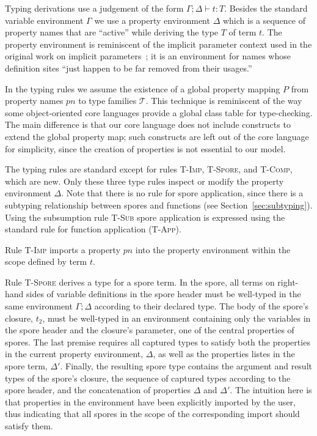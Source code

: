 \documentclass[a4paper,twoside]{article}
\begin{document}
Typing derivations use a judgement of the form $\Gamma ; \Delta \vdash t : T$. Besides the standard variable environment $\Gamma$ we use a property environment $\Delta$ which is a sequence of property names that are ``active'' while deriving the type $T$ of term $t$. The property environment is reminiscent of the implicit parameter context used in the original work on implicit parameters~\cite{LewisLMS00}; it is an environment for names whose definition sites ``just happen to be far removed from their usages.''

In the typing rules we assume the existence of a global property mapping $P$ from property names $pn$ to type families $\mathcal{T}$. This technique is reminiscent of the way some object-oriented core languages provide a global class table for type-checking. The main difference is that our core language does not include constructs to extend the global property map; such constructs are left out of the core language for simplicity, since the creation of properties is not essential to our model.

The typing rules are standard except for rules \textsc{T-Imp}, \textsc{T-Spore}, and \textsc{T-Comp}, which are new. Only these three type rules inspect or modify the property environment $\Delta$. Note that there is no rule for spore application, since there is a subtyping relationship between spores and functions (see Section~\ref{sec:subtyping}). Using the subsumption rule \textsc{T-Sub} spore application is expressed using the standard rule for function application (\textsc{T-App}).

Rule \textsc{T-Imp} imports a property $pn$ into the property environment within the scope defined by term $t$.

Rule \textsc{T-Spore} derives a type for a spore term. In the spore, all terms on right-hand sides of variable definitions in the spore header must be well-typed in the same environment $\Gamma ; \Delta$ according to their declared type. The body of the spore's closure, $t_2$, must be well-typed in an environment containing only the variables in the spore header and the closure's parameter, one of the central properties of spores. The last premise requires all captured types to satisfy both the properties in the current property environment, $\Delta$, as well as the properties listes in the spore term, $\Delta'$. Finally, the resulting spore type contains the argument and result types of the spore's closure, the sequence of captured types according to the spore header, and the concatenation of properties $\Delta$ and $\Delta'$. The intuition here is that properties in the environment have been explicitly imported by the user, thus indicating that all spores in the scope of the corresponding import should satisfy them.
\end{document}
